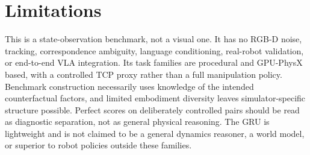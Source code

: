 \section{Limitations}
This is a state-observation benchmark, not a visual one. It has no RGB-D noise, tracking, correspondence ambiguity, language conditioning, real-robot validation, or end-to-end VLA integration. Its task families are procedural and GPU-PhysX based, with a controlled TCP proxy rather than a full manipulation policy. Benchmark construction necessarily uses knowledge of the intended counterfactual factors, and limited embodiment diversity leaves simulator-specific structure possible. Perfect scores on deliberately controlled pairs should be read as diagnostic separation, not as general physical reasoning. The GRU is lightweight and is not claimed to be a general dynamics reasoner, a world model, or superior to robot policies outside these families.
